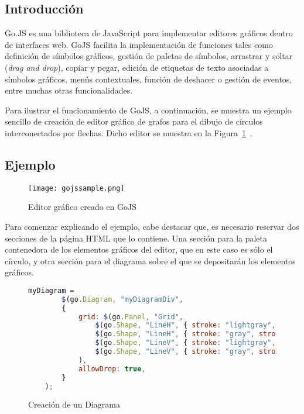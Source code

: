 \subsection{Introducción}

Go.JS \cite{gojs} es una biblioteca de JavaScript para implementar editores gráficos dentro de interfaces web. GoJS facilita la implementación de funciones tales como definición de símbolos gráficos, gestión de paletas de símbolos, arrastrar y soltar (\emph{drag and drop}), copiar y pegar, edición de etiquetas de texto asociadas a símbolos gráficos, menús contextuales, función de deshacer o gestión de eventos, entre muchas otras funcionalidades.

Para ilustrar el funcionamiento de GoJS, a continuación, se muestra un ejemplo sencillo de creación de editor gráfico de grafos para el dibujo de círculos interconectados por flechas. Dicho editor se muestra en la Figura~\ref{fig:gojssample}~.

\subsection{Ejemplo}

\begin{figure}[!tb]
	\centering
	\texttt{[image: gojssample.png]}
	\caption{Editor gráfico creado en GoJS}
    \label{fig:gojssample}
\end{figure}



Para comenzar explicando el ejemplo, cabe destacar que, es necesario reservar dos secciones de la página HTML que lo contiene. Una sección para la paleta contenedora de los elementos gráficos del editor, que en este caso es sólo el círculo, y otra sección para el diagrama sobre el que se depositarán los elementos gráficos. 


\begin{figure}[!tb]
	\centering
	\begin{lstlisting}[language=JavaScript]
	myDiagram =
		$(go.Diagram, "myDiagramDiv",  
		{
			grid: $(go.Panel, "Grid",
				$(go.Shape, "LineH", { stroke: "lightgray", strokeWidth: 0.5 }),
				$(go.Shape, "LineH", { stroke: "gray", strokeWidth: 0.5, interval: 10 }),
				$(go.Shape, "LineV", { stroke: "lightgray", strokeWidth: 0.5 }),
				$(go.Shape, "LineV", { stroke: "gray", strokeWidth: 0.5, interval: 10 })
			),
			allowDrop: true,         
		}
	);
	\end{lstlisting}
	\caption{Creación de un Diagrama}
	\label{fig:creacionDiagrama}
\end{figure}



